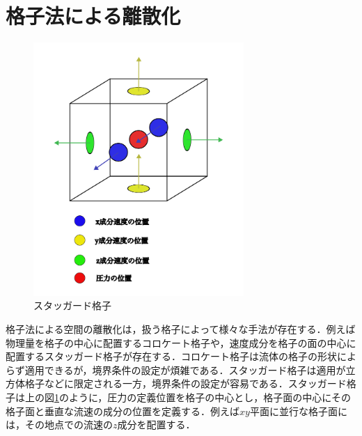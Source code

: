\documentclass[a4j,12pt]{jreport}
\begin{document}
\section{格子法による離散化}
\begin{figure}[H]
\begin{center}
\includegraphics[width=80mm]{images/3dstaggerd.png}
\caption{スタッガード格子}
\label{fig:staggerd}
\end{center}
\end{figure}
格子法による空間の離散化は，扱う格子によって様々な手法が存在する．例えば物理量を格子の中心に配置するコロケート格子や，速度成分を格子の面の中心に配置するスタッガード格子が存在する．コロケート格子は流体の格子の形状によらず適用できるが，境界条件の設定が煩雑である．スタッガード格子は適用が立方体格子などに限定される一方，境界条件の設定が容易である．スタッガード格子は上の図\ref{fig:staggerd}のように，圧力の定義位置を格子の中心とし，格子面の中心にその格子面と垂直な流速の成分の位置を定義する．例えば$xy$平面に並行な格子面には，その地点での流速の$z$成分を配置する．

\end{document}
